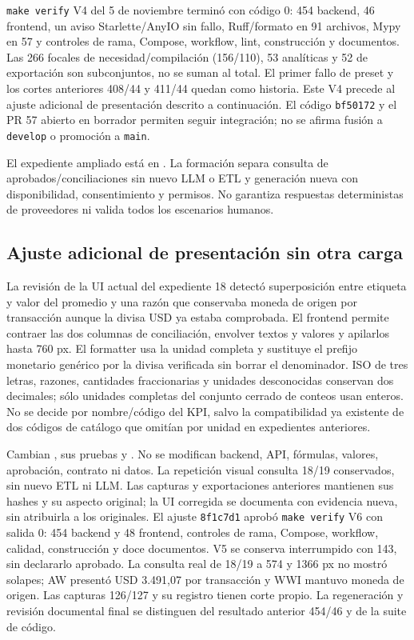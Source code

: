 \documentclass[11pt,letterpaper]{article}
\newcommand{\file}[1]{\texttt{#1}}
\begin{document}
\file{make verify} V4 del 5 de noviembre terminó con código 0: 454 backend,
46 frontend, un aviso Starlette/AnyIO sin fallo, Ruff/formato en 91 archivos,
Mypy en 57 y controles de rama, Compose, workflow, lint, construcción y documentos.
Las 266 focales de necesidad/compilación (156/110), 53 analíticas y 52 de
exportación son subconjuntos, no se suman al total. El primer fallo de preset y
los cortes anteriores 408/44 y 411/44 quedan como historia. Este V4 precede al
ajuste adicional de presentación descrito a continuación.
El código \file{bf50172} y el PR 57 abierto en borrador permiten seguir integración;
no se afirma fusión a \file{develop} o promoción a \file{main}.

El expediente ampliado está en .
La formación separa consulta de aprobados/conciliaciones sin nuevo LLM o ETL y
generación nueva con disponibilidad, consentimiento y permisos. No garantiza
respuestas deterministas de proveedores ni valida todos los escenarios humanos.

\subsection{Ajuste adicional de presentación sin otra carga}

La revisión de la UI actual del expediente 18 detectó superposición entre etiqueta
y valor del promedio y una razón que conservaba moneda de origen por transacción
aunque la divisa USD ya estaba comprobada. El frontend permite contraer las dos
columnas de conciliación, envolver textos y valores y apilarlos hasta 760 px.
El formatter usa la unidad completa y sustituye el prefijo monetario genérico por
la divisa verificada sin borrar el denominador. ISO de tres letras, razones,
cantidades fraccionarias y unidades desconocidas conservan dos decimales; sólo
unidades completas del conjunto cerrado de conteos usan enteros. No se decide por
nombre/código del KPI, salvo la compatibilidad ya existente de dos códigos de
catálogo que omitían por unidad en expedientes anteriores.

Cambian , sus pruebas y .
No se modifican backend, API, fórmulas, valores, aprobación, contrato ni datos.
La repetición visual consulta 18/19 conservados, sin nuevo ETL ni LLM. Las capturas
y exportaciones anteriores mantienen sus hashes y su aspecto original; la UI
corregida se documenta con evidencia nueva, sin atribuirla a los originales.
El ajuste \file{8f1c7d1} aprobó \file{make verify} V6 con salida 0: 454 backend
y 48 frontend, controles de rama, Compose, workflow, calidad, construcción y doce
documentos. V5 se conserva interrumpido con 143, sin declararlo aprobado.
La consulta real de 18/19 a 574 y 1366 px no mostró solapes; AW presentó
USD 3.491,07 por transacción y WWI mantuvo moneda de origen. Las capturas 126/127
y su registro tienen corte propio. La regeneración y revisión documental final
se distinguen del resultado anterior 454/46 y de la suite de código.
\end{document}
